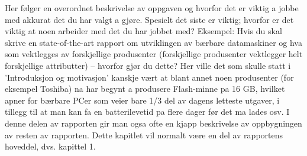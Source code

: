 Her følger en overordnet beskrivelse av oppgaven og hvorfor det er viktig a jobbe med akkurat det du har valgt a gjøre. Spesielt det siste er viktig; hvorfor er det viktig at noen arbeider med det du har jobbet med? Eksempel: Hvis du skal skrive en state-of-the-art rapport om utviklingen av bærbare datamaskiner og hva som vektlegges av forskjellige produsenter (forskjellige produsenter vektlegger helt forskjellige attributter) – hvorfor gjør du dette? Her ville det som skulle statt i ’Introduksjon og motivasjon’ kanskje vært at blant annet noen produsenter (for eksempel Toshiba) na har begynt a produsere Flash-minne pa 16 GB, hvilket apner for bærbare PCer som veier bare 1/3 del av dagens letteste utgaver, i tillegg til at man kan fa en batterilevetid pa flere dager før det ma lades osv.
I denne delen av rapporten gir man ogsa ofte en kjapp beskrivelse av oppbygningen av resten av rapporten. Dette kapitlet vil normalt være en del av rapportens hoveddel, dvs. kapittel 1.